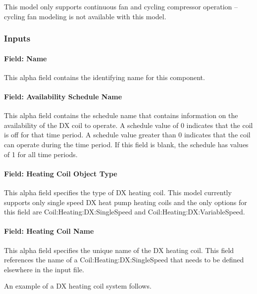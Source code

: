 This model only supports continuous fan and cycling compressor operation -- cycling fan modeling is not available with this model.

\subsubsection{Inputs}\label{inputs-24}

\paragraph{Field: Name}\label{field-name-23-000}

This alpha field contains the identifying name for this component.

\paragraph{Field: Availability Schedule Name}\label{field-availability-schedule-name-14}

This alpha field contains the schedule name that contains information on the availability of the DX coil to operate. A schedule value of 0 indicates that the coil is off for that time period. A schedule value greater than 0 indicates that the coil can operate during the time period. If this field is blank, the schedule has values of 1 for all time periods.

\paragraph{Field: Heating Coil Object Type}\label{field-heating-coil-object-type-000}

This alpha field specifies the type of DX heating coil. This model currently supports only single speed DX heat pump heating coils and the only options for this field are Coil:Heating:DX:SingleSpeed and Coil:Heating:DX:VariableSpeed.

\paragraph{Field: Heating Coil Name}\label{field-heating-coil-name-000}

This alpha field specifies the unique name of the DX heating coil. This field references the name of a Coil:Heating:DX:SingleSpeed that needs to be defined elsewhere in the input file.

An example of a DX heating coil system follows.

